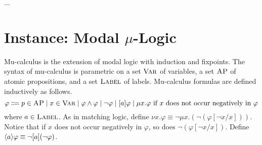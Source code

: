 \documentclass{amsart}
\begin{document}
...


\section{Instance: Modal $\mu$-Logic}
\label{sec_mu_calculus}

Mu-calculus is the extension of modal logic with
induction and fixpoints.
The syntax of mu-calculus is parametric on a set ${\normalfont\textsc{Var}}$ of variables,
a set $\textsc{AP}$ of atomic propositions,
and a set $\textsc{Label}$ of labels.
Mu-calculus formulas are defined inductively as follows.
$$
\varphi \Coloneqq
p \in \textsc{AP} \mid
x \in {\normalfont\textsc{Var}} \mid
\varphi \wedge \varphi \mid
\neg \varphi \mid 
[a] \varphi \mid
\mu x . \varphi \text{ if $x$ does not occur negatively in $\varphi$}
$$
where $a \in \textsc{Label}$.
As in matching logic, define $\nu x . \varphi \equiv \neg \mu x . (\neg
(\varphi[\neg x / x]))$.
Notice that if $x$ does not occur negatively in $\varphi$,
so does $\neg (\varphi[\neg x / x])$.
Define $\langle a\rangle \varphi \equiv \neg [a] (\neg \varphi)$.
\end{document}
